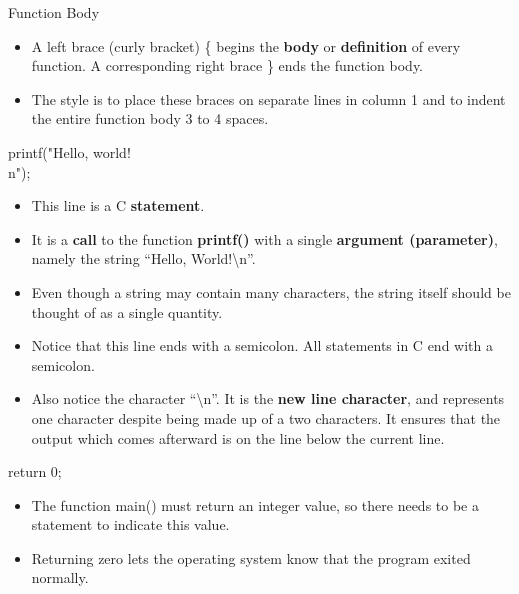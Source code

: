 \documentclass[graphics]{beamer}
\begin{document}
\begin{frame}{Function Body}
    \begin{itemize}
        \item A left brace (curly bracket) \{ begins the \textbf{body} or \textbf{definition} of every function.  A corresponding right brace \} ends the function body.
        \item The style is to place these braces on separate lines in column 1 and to indent the entire function body 3 to 4 spaces.
    \end{itemize}
\end{frame}

\begin{frame}{printf("Hello, world!\\n");}
    \begin{itemize}
        \item This line is a C \textbf{statement}.
        \item It is a \textbf{call} to the function \textbf{printf()} with a single \textbf{argument (parameter)}, namely the string ``Hello, World!\textbackslash n''.
        \item Even though a string may contain many characters, the string itself should be thought of as a single quantity.
        \item Notice that this line ends with a semicolon. All statements in C end with a semicolon.
        \item Also notice the character ``\textbackslash n''. It is the \textbf{new line character}, and represents one character despite being made up of a two characters. It ensures that the output which comes afterward is on the line below the current line.
    \end{itemize}
\end{frame}

\begin{frame}{return 0;}
    \begin{itemize}
        \item The function main() must return an integer value, so there needs to be a statement to indicate this value.
        \item Returning zero lets the operating system know that the program exited normally.
    \end{itemize}
\end{frame}
\end{document}
